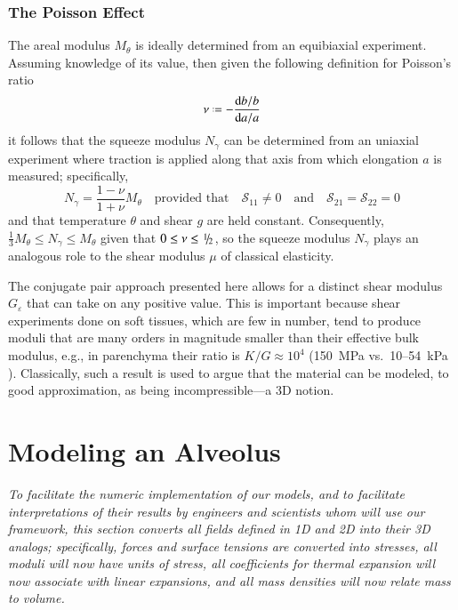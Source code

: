 \subsubsection{The Poisson Effect}

The areal modulus $M_{\theta}$ is ideally determined from an equibiaxial experiment.  Assuming knowledge of its value, then given the following definition for Poisson's ratio
\begin{displaymath}
\nu \defeq - \frac{\mathrm{d}b / b}{\mathrm{d}a / a}
\end{displaymath}
it follows that the squeeze modulus $N_{\gamma}$ can be determined from an uniaxial experiment where traction is applied along that axis from which elongation $a$ is measured; specifically,
\begin{displaymath}
N_{\gamma} = \frac{1 - \nu}{1 + \nu} M_{\theta}
\quad \text{provided that} \quad
\mathcal{S}_{11} \neq 0 
\quad \text{and} \quad
\mathcal{S}_{21} = \mathcal{S}_{22} = 0 
\end{displaymath}
and that temperature $\theta$ and shear $g$ are held constant.  Consequently, $\tfrac{1}{3} M_{\theta} \leq N_{\gamma} \leq M_{\theta}$ given that $0 \leq \nu \leq \textfrac{1}{2}$, so the squeeze modulus $N_{\gamma}$ plays an analogous role to the shear modulus $\mu$ of classical elasticity.  

The conjugate pair approach presented here allows for a distinct shear modulus $G_{\varepsilon}$ that can take on any positive value.  This is important because shear experiments done on soft tissues, which are few in number, tend to produce moduli that are many orders in magnitude smaller than their effective bulk modulus, e.g., in parenchyma their ratio is $K/G \approx 10^{4}$ (150~MPa vs.\ 10--54~kPa \cite{Sarafetal07}).  Classically, such a result is used to argue that the material can be modeled, to  good approximation, as being incompressible---a 3D notion.

\section{Modeling an Alveolus}
\label{secAlveolus}

\textit{To facilitate the numeric implementation of our models, and to facilitate interpretations of their results by engineers and scientists whom will use our framework, this section converts all fields defined in 1D and 2D into their 3D analogs; specifically, forces and surface tensions are converted into stresses, all moduli will now have units of stress, all coefficients for thermal expansion will now associate with linear expansions, and all mass densities will now relate mass to volume.}

